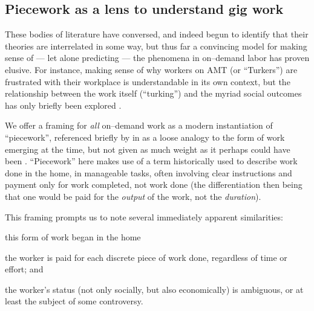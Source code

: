 \documentclass[trackingWork]{subfiles}
\begin{document}
\subsection{Piecework as a lens to understand gig work}
These bodies of literature have conversed,
and indeed begun to identify that their theories are interrelated in some way,
but thus far a convincing model for making sense of
--- let alone predicting ---
the phenomena in on--demand labor has proven elusive.
For instance, 
making sense of why workers on AMT (or ``Turkers'') are frustrated with their workplace
is understandable in its own context, but
the relationship between the work itself (``turking'')
and the myriad social outcomes has only briefly been explored
\cite{crowdcollab}.

We offer a framing for \textit{all} on--demand work as a modern instantiation of ``piecework'',
referenced briefly by
\citeauthor{crowdworkFuture}
in
\citeyear{crowdworkFuture}
as a loose analogy to the form of work emerging at the time,
but not given as much weight as it perhaps could have been
\cite{crowdworkFuture}.
``Piecework'' here makes use of
a term historically used to describe work done in the home,
in manageable tasks,
often involving clear instructions
and payment only for work completed, not work done
(the differentiation then being that
one would be paid for the \textit{output} of the work,
not the \textit{duration}).

This framing prompts us to note several immediately apparent similarities:
\begin{inlinelist}
\item this form of work began in the home
\item the worker is paid for each discrete piece of work done, regardless of time or effort; and
\item the worker's status
(not only socially, but also economically)
is ambiguous, or at least the subject of some controversy.
\end{inlinelist}

\end{document}
